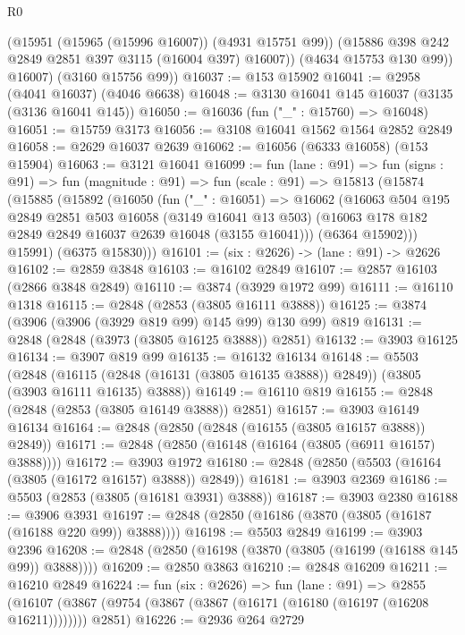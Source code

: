 \begin{lexlean}{R0}
\begin{coremodule}
            (@15951 (@15965 (@15996 @16007)) (@4931 @15751 @99))
            (@15886 @398 @242 @2849 @2851 @397 @3115 (@16004 @397) @16007))
          (@4634 @15753 @130 @99))
        @16007)
      (@3160 @15756 @99))
@16037 := @153 @15902
@16041 := @2958 (@4041 @16037) (@4046 @6638)
@16048 := @3130 @16041 @145 @16037 (@3135 (@3136 @16041 @145))
@16050 := @16036 (fun ("_" : @15760) => @16048)
@16051 := @15759 @3173
@16056 := @3108 @16041 @1562 @1564 @2852 @2849
@16058 := @2629 @16037 @2639
@16062 := @16056 (@6333 @16058) (@153 @15904)
@16063 := @3121 @16041
@16099 := fun (lane : @91) =>
  fun (signs : @91) =>
  fun (magnitude : @91) =>
  fun (scale : @91) =>
  @15813
    (@15874
      (@15885
        (@15892
          (@16050
            (fun ("_" : @16051) =>
            @16062
              (@16063
                @504
                @195
                @2849
                @2851
                @503
                @16058
                (@3149 @16041 @13 @503)
                (@16063 @178 @182 @2849 @2849 @16037 @2639 @16048 (@3155 @16041)))
              (@6364 @15902)))
          @15991)
        (@6375 @15830)))
@16101 := (six : @2626) -> (lane : @91) -> @2626
@16102 := @2859 @3848
@16103 := @16102 @2849
@16107 := @2857 @16103 (@2866 @3848 @2849)
@16110 := @3874 (@3929 @1972 @99)
@16111 := @16110 @1318
@16115 := @2848 (@2853 (@3805 @16111 @3888))
@16125 := @3874 (@3906 (@3906 (@3929 @819 @99) @145 @99) @130 @99) @819
@16131 := @2848 (@2848 (@3973 (@3805 @16125 @3888)) @2851)
@16132 := @3903 @16125
@16134 := @3907 @819 @99
@16135 := @16132 @16134
@16148 := @5503
    (@2848 (@16115 (@2848 (@16131 (@3805 @16135 @3888)) @2849)) (@3805 (@3903 @16111 @16135) @3888))
@16149 := @16110 @819
@16155 := @2848 (@2848 (@2853 (@3805 @16149 @3888)) @2851)
@16157 := @3903 @16149 @16134
@16164 := @2848 (@2850 (@2848 (@16155 (@3805 @16157 @3888)) @2849))
@16171 := @2848 (@2850 (@16148 (@16164 (@3805 (@6911 @16157) @3888))))
@16172 := @3903 @1972
@16180 := @2848 (@2850 (@5503 (@16164 (@3805 (@16172 @16157) @3888)) @2849))
@16181 := @3903 @2369
@16186 := @5503 (@2853 (@3805 (@16181 @3931) @3888))
@16187 := @3903 @2380
@16188 := @3906 @3931
@16197 := @2848 (@2850 (@16186 (@3870 (@3805 (@16187 (@16188 @220 @99)) @3888))))
@16198 := @5503 @2849
@16199 := @3903 @2396
@16208 := @2848 (@2850 (@16198 (@3870 (@3805 (@16199 (@16188 @145 @99)) @3888))))
@16209 := @2850 @3863
@16210 := @2848 @16209
@16211 := @16210 @2849
@16224 := fun (six : @2626) =>
  fun (lane : @91) =>
  @2855 (@16107 (@3867 (@9754 (@3867 (@3867 (@16171 (@16180 (@16197 (@16208 @16211)))))))) @2851)
@16226 := @2936 @264 @2729

\end{coremodule}
\end{lexlean}
